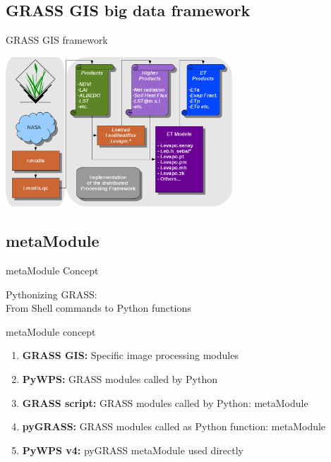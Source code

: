 \documentclass[aspectratio=169,unknownkeysallowed,xcolor=dvipsnames,beamer]{beamer} %
\begin{document}
\subsection{GRASS GIS big data framework}
\begin{frame}[fragile]{GRASS GIS framework}

\begin{center}
 \includegraphics[width=8.5cm]{architecture_implementation}
\end{center}

\end{frame}

\subsection{metaModule}
\begin{frame}[fragile]{metaModule Concept}

Pythonizing GRASS:\\ From Shell commands to Python functions 

\begin{block}{metaModule concept}
\begin{enumerate}
 \item {\bf GRASS GIS:} Specific image processing modules
 \item {\bf PyWPS:} GRASS modules called by Python
 \item {\bf GRASS script:} GRASS modules called by Python: metaModule
 \item {\bf pyGRASS:} GRASS modules called as Python function: metaModule
 \item {\bf PyWPS v4:} pyGRASS metaModule used directly
\end{enumerate}

\end{block}

\end{frame}
\end{document}
